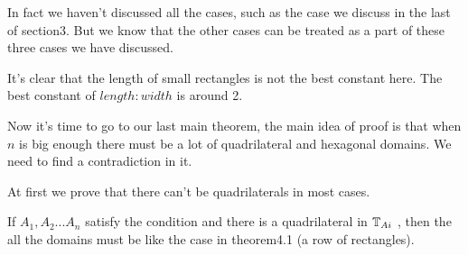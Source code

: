 \begin{rem}
	In fact we haven't discussed all the cases, such as the case
	we discuss in the last of section3. But we know that the other cases 
	can be treated as a part of these three cases we have discussed.
\end{rem}
	
\begin{rem}
	It's clear that the length of small rectangles is not the best 
	constant here. The best constant of $length:width$ is around 2.
\end{rem}
	
Now it's time to go to our last main theorem, the main idea of proof 
is that when $n$ is big enough there must be a lot of quadrilateral 
and hexagonal domains. We need to find a contradiction in it.
	
At first we prove that there can't be quadrilaterals in most cases.
	
\begin{thm}
	If $A_1, A_2 ... A_n$ satisfy the condition and there is 
	a quadrilateral in $\mathbb{T}_{Ai}$ , then the all the domains 
	must be like the case in theorem4.1 (a row of rectangles).
\end{thm}
	
